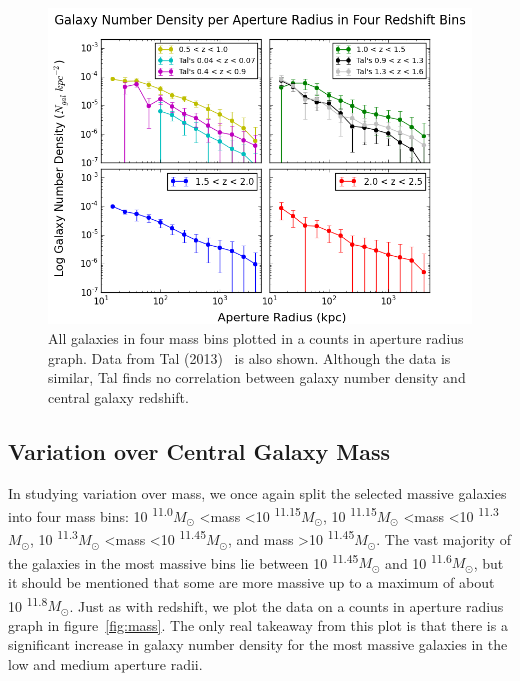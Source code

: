 \documentclass[apj]{emulateapj}
\begin{document}
\begin{figure}
\centering
\graphicspath{{C:/3d_hst/2015_finals/aperture_distance/}}
\includegraphics[width=\linewidth]{temp_zpanel_final}
\caption{\footnotesize All galaxies in four mass bins plotted in a counts in aperture radius graph. Data from Tal (2013)~\cite{2013ApJ...769...31T} is also shown. Although the data is similar, Tal finds no correlation between galaxy number density and central galaxy redshift.}
\label{fig:zpanel}
\end{figure}

\subsection{Variation over Central Galaxy Mass}

In studying variation over mass, we once again split the selected massive galaxies into four mass bins: 10 \textsuperscript{11.0}$M_{\odot}$ \textless mass \textless 10 \textsuperscript{11.15}$M_{\odot}$, 10 \textsuperscript{11.15}$M_{\odot}$ \textless mass \textless 10 \textsuperscript{11.3}$M_{\odot}$, 10 \textsuperscript{11.3}$M_{\odot}$ \textless mass \textless 10 \textsuperscript{11.45}$M_{\odot}$, and mass \textgreater 10 \textsuperscript{11.45}$M_{\odot}$. The vast majority of the galaxies in the most massive bins lie between 10 \textsuperscript{11.45}$M_{\odot}$ and 10 \textsuperscript{11.6}$M_{\odot}$, but it should be mentioned that some are more massive up to a maximum of about 10 \textsuperscript{11.8}$M_{\odot}$. Just as with redshift, we plot the data on a counts in aperture radius graph in figure~\ref{fig:mass}. The only real takeaway from this plot is that there is a significant increase in galaxy number density for the most massive galaxies in the low and medium aperture radii.
\end{document}
